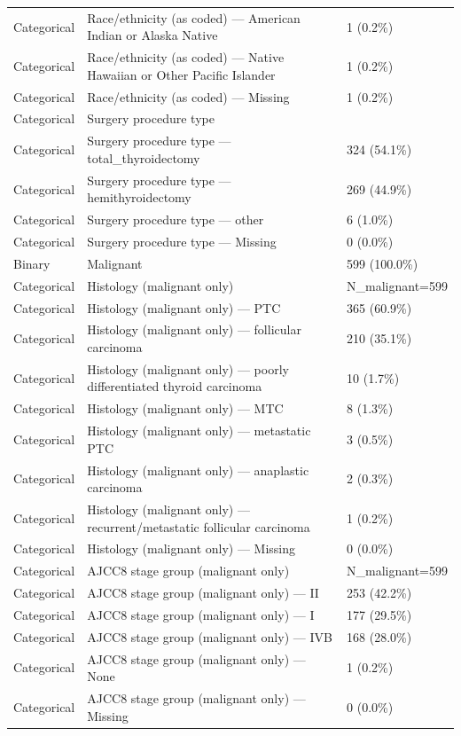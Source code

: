 \begin{table}[htbp]
\begin{tabular}{lll}
Categorical & Race/ethnicity (as coded) — American Indian or Alaska Native & 1 (0.2\%) \\
Categorical & Race/ethnicity (as coded) — Native Hawaiian or Other Pacific Islander & 1 (0.2\%) \\
Categorical & Race/ethnicity (as coded) — Missing & 1 (0.2\%) \\
Categorical & Surgery procedure type &  \\
Categorical & Surgery procedure type — total\_thyroidectomy & 324 (54.1\%) \\
Categorical & Surgery procedure type — hemithyroidectomy & 269 (44.9\%) \\
Categorical & Surgery procedure type — other & 6 (1.0\%) \\
Categorical & Surgery procedure type — Missing & 0 (0.0\%) \\
Binary & Malignant & 599 (100.0\%) \\
Categorical & Histology (malignant only) & N\_malignant=599 \\
Categorical & Histology (malignant only) — PTC & 365 (60.9\%) \\
Categorical & Histology (malignant only) — follicular carcinoma & 210 (35.1\%) \\
Categorical & Histology (malignant only) — poorly differentiated thyroid carcinoma & 10 (1.7\%) \\
Categorical & Histology (malignant only) — MTC & 8 (1.3\%) \\
Categorical & Histology (malignant only) — metastatic PTC & 3 (0.5\%) \\
Categorical & Histology (malignant only) — anaplastic carcinoma & 2 (0.3\%) \\
Categorical & Histology (malignant only) — recurrent/metastatic follicular carcinoma & 1 (0.2\%) \\
Categorical & Histology (malignant only) — Missing & 0 (0.0\%) \\
Categorical & AJCC8 stage group (malignant only) & N\_malignant=599 \\
Categorical & AJCC8 stage group (malignant only) — II & 253 (42.2\%) \\
Categorical & AJCC8 stage group (malignant only) — I & 177 (29.5\%) \\
Categorical & AJCC8 stage group (malignant only) — IVB & 168 (28.0\%) \\
Categorical & AJCC8 stage group (malignant only) — None & 1 (0.2\%) \\
Categorical & AJCC8 stage group (malignant only) — Missing & 0 (0.0\%) \\

\end{tabular}
\end{table}
